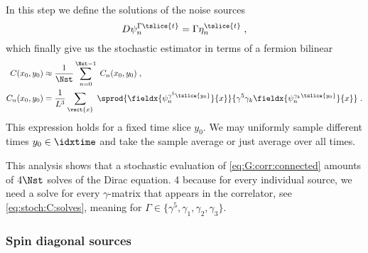 In this step we define the solutions of the noise sources
\begin{equation} \label{eq:stoch:C:solves}
D \psi_{n}^{\Gamma \tslice{t}} = \Gamma \eta_n^{\tslice{t}} \;,
\end{equation}
which finally give us the stochastic estimator in terms of a fermion bilinear
\begin{align} \label{eq:stoch:C:full:final}
C(x_0, y_0)
&\approx \frac{1}{\Nst} \sum_{n=0}^{\Nst-1} \; C_n(x_0, y_0) \;, \\
C_n(x_0, y_0)
&= \frac{1}{L^{3}} \sum_{\vect{x}} \;
\sprod{
  \fieldx{\psi_{n}^{\gamma^{5} \tslice{y_0}}}{x}
}{
  \gamma^{5}
  \gamma_k
  \fieldx{\psi_{n}^{\gamma_k \tslice{y_0}}}{x}
} \;.
\end{align}
This expression holds for a fixed time slice $y_0$.
We may uniformly sample different times $y_0 \in \idxtime$ and take the sample average or just average over all times.

This analysis shows that a stochastic evaluation of \cref{eq:G:corr:connected} amounts of $4 \Nst$ solves of the Dirac equation. \num{4} because for every individual source, we need a solve for every $\gamma$-matrix that appears in the correlator, see \cref{eq:stoch:C:solves}, meaning for $\Gamma \in \{ \gamma^{5}, \gamma_1, \gamma_2, \gamma_3 \}$.

\subsubsection{Spin diagonal sources}




